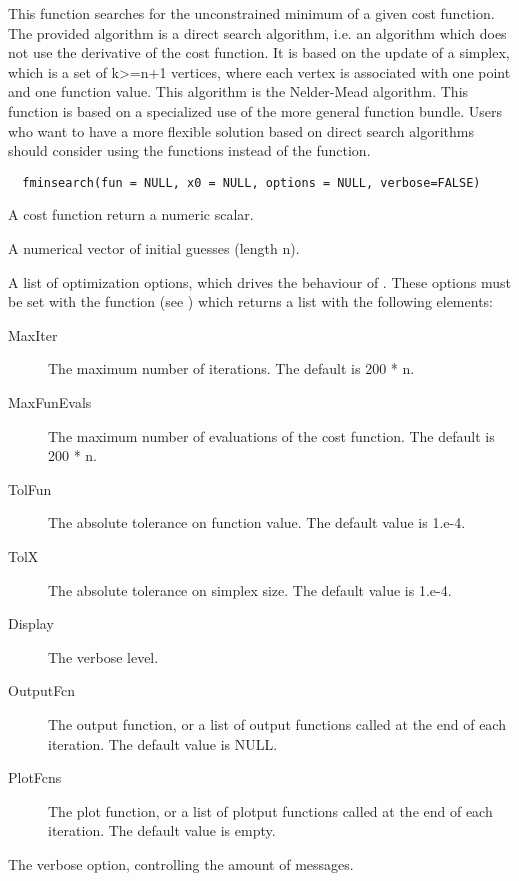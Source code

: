 %
\begin{Description}\relax
This function searches for the unconstrained minimum of a given cost function.
The provided algorithm is a direct search algorithm, i.e. an algorithm which
does not use the derivative of the cost function. It is based on the update of
a simplex, which is a set of k>=n+1 vertices, where each vertex is associated
with one point and one function value. This algorithm is the Nelder-Mead
algorithm. This function is based on a specialized use of the more general
 function bundle. Users who want to have a more flexible
solution based on direct search algorithms should consider using the
 functions instead of the  function.
\end{Description}
%
\begin{Usage}
\begin{verbatim}
  fminsearch(fun = NULL, x0 = NULL, options = NULL, verbose=FALSE)
\end{verbatim}
\end{Usage}
%
\begin{Arguments}
\begin{ldescription}
\item[\code{fun}] A cost function return a numeric scalar.
\item[\code{x0}] A numerical vector of initial guesses (length n).
\item[\code{options}] A list of optimization options, which drives the behaviour of
. These options must be set with the 
function (see ) which returns a list with the following
elements: \begin{description}

\item[MaxIter] The maximum number of iterations. The default is 200 * n.
\item[MaxFunEvals] The maximum number of evaluations of the cost function.
The default is 200 * n.
\item[TolFun] The absolute tolerance on function value. The default value
is 1.e-4.
\item[TolX] The absolute tolerance on simplex size. The default value is
1.e-4.
\item[Display] The verbose level.
\item[OutputFcn] The output function, or a list of output functions
called at the end of each iteration. The default value is NULL.
\item[PlotFcns] The plot function, or a list of plotput functions called
at the end of each iteration. The default value is empty.

\end{description}


\item[\code{verbose}] The verbose option, controlling the amount of messages.
\end{ldescription}
\end{Arguments}
